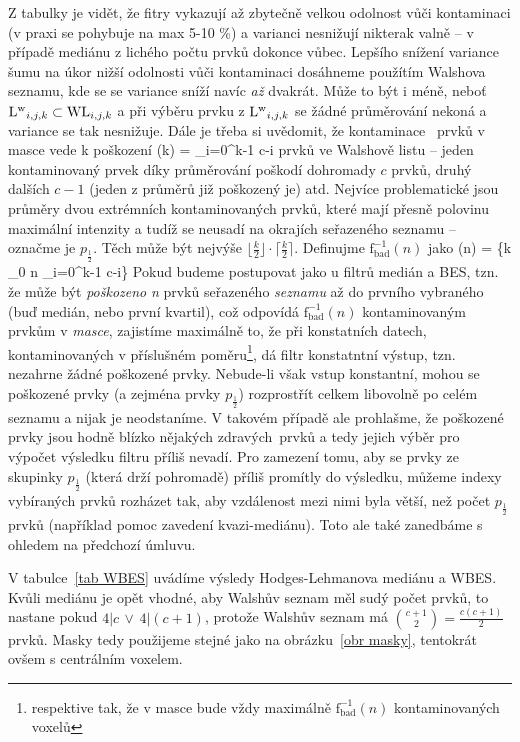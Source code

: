     Z tabulky je vidět, že fitry vykazují až zbytečně velkou odolnost vůči kontaminaci (v praxi se pohybuje na max 5-10 \%) a varianci nesnižují nikterak valně -- v případě mediánu z lichého počtu prvků dokonce vůbec. Lepšího snížení variance šumu na úkor nižší odolnosti vůči kontaminaci dosáhneme použítím Walshova seznamu, kde se se variance sníží navíc \emph{až} dvakrát. Může to být i méně, neboť ${\mathrm{L^w}_{i,j,k}} \subset {\mathrm{WL}_{i,j,k}}$ a při výběru prvku z ${\mathrm{L^w}_{i,j,k}}$ se žádné průměrování nekoná a variance se tak nesnižuje. Dále je třeba si uvědomit, že kontaminace \kk~prvků v masce vede k poškození
    \beq
    (k) = \sum_{i=0}^{k-1} c-i
    \eeq
    prvků ve Walshově listu -- jeden kontaminovaný prvek díky průměrování poškodí dohromady $c$ prvků, druhý dalších $c-1$ (jeden z průměrů již poškozený je) atd. Nejvíce problematické jsou průměry dvou extrémních kontaminovaných prvků, které mají přesně polovinu maximální intenzity a tudíž se neusadí na okrajích seřazeného seznamu -- označme je $p_{\frac{1}{2}}$. Těch může být nejvýše $\lfloor\frac{k}{2}\rfloor\cdot\lceil\frac{k}{2}\rceil$. Definujme $\mathrm{f_{bad}^{-1}}(n)$ jako
    \beq
    (n) = \max\bigg\{k \in \Nn_0 \;\bigg\vert\; n \geq \sum_{i=0}^{k-1} c-i\bigg\}
    \eeq
    Pokud budeme postupovat jako u filtrů medián a BES, tzn. že může být \emph{poškozeno} \textit{n} prvků seřazeného \emph{seznamu} až do prvního vybraného (buď medián, nebo první kvartil), což odpovídá $\mathrm{f_{bad}^{-1}}(n)$ kontaminovaným prvkům v \emph{masce}, zajistíme maximálně to, že při konstatních datech, kontaminovaných v příslušném poměru\footnote{respektive tak, že v masce bude vždy maximálně $\mathrm{f_{bad}^{-1}}(n)$ kontaminovaných voxelů}, dá filtr konstatntní výstup, tzn. nezahrne žádné poškozené prvky. Nebude-li však vstup konstantní, mohou se poškozené prvky (a zejména prvky $p_{\frac{1}{2}}$) rozprostřít celkem libovolně po celém seznamu a nijak je neodstaníme. V takovém případě ale prohlašme, že poškozené prvky jsou hodně blízko nějakých \bq zdravých\eq ~prvků a tedy jejich výběr pro výpočet výsledku filtru příliš nevadí. Pro zamezení tomu, aby se prvky ze skupinky $p_{\frac{1}{2}}$ (která drží pohromadě) příliš promítly do výsledku, můžeme indexy vybíraných prvků rozházet tak, aby vzdálenost mezi nimi byla větší, než počet $p_{\frac{1}{2}}$ prvků (například pomoc zavedení kvazi-mediánu). Toto ale také zanedbáme s ohledem na předchozí úmluvu.

    V tabulce~\ref{tab WBES} uvádíme výsledy Hodges-Lehmanova mediánu a WBES. Kvůli mediánu je opět vhodné, aby Walshův seznam měl sudý počet prvků, to nastane pokud $4|c \,\vee\, 4|(c+1)$, protože Walshův seznam má ${c+1 \choose 2} = \frac{c(c+1)}{2}$ prvků. Masky tedy použijeme stejné jako na obrázku~\ref{obr masky}, tentokrát ovšem s centrálním voxelem.

